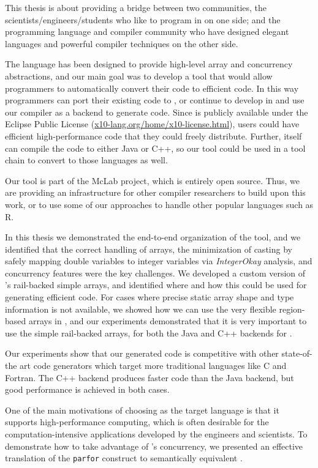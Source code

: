 This thesis is about providing a bridge between two communities,  the
scientists/engineers/students who like to program in \matlab on one
side;  and the programming language and compiler community who have
designed elegant languages and powerful compiler techniques on the other
side.   

The \xten language has been designed to provide high-level  array and
concurrency abstractions,  and  our main goal was to develop a tool that
would allow programmers to automatically convert their \matlab code to
efficient \xten code.    In this way programmers can port their existing
\matlab code to \xten,  or continue to develop in \matlab and use our
\mixten compiler as a backend to generate \xten code.    Since \xten is
publicly available under the Eclipse Public License
(\url{x10-lang.org/home/x10-license.html}),  users could have efficient
high-performance code that they could freely distribute.    Further,
\xten itself can compile the code to either Java or C++,  so our tool
could be used in a tool chain to convert \matlab to those languages as
well.

Our tool is part of the McLab project, which is entirely open
source.   Thus, we are providing  an infrastructure for other compiler
researchers to build upon this work,  or to use some of our approaches
to handle other popular languages such as R.

In this thesis we demonstrated the end-to-end organization of the \mixten
tool, and we identified that the correct handling of arrays, the
minimization of casting by safely mapping \matlab double variables to
\xten integer variables via \emph{IntegerOkay} analysis,  and concurrency
features were the key challenges.   We developed a custom version of \xten's
rail-backed simple arrays,  and identified where and how this
could be used for generating efficient \xten code.  For cases where
precise static array shape and type information is not available, we
showed how we can use the very flexible region-based arrays in \xten,
and our experiments demonstrated that it is very important to use the
simple rail-backed arrays, for both the Java and C++ backends for \xten.

Our experiments show that our generated \xten code is competitive with
other state-of-the art code generators which target more traditional
languages like C and Fortran.   The C++ \xten backend produces faster
code than the Java backend,  but good performance is achieved in both
cases.  

One of the main motivations of choosing \xten as the target language is
that it supports high-performance computing,  which is often desirable
for the computation-intensive applications developed by the engineers
and scientists.   To demonstrate how to take advantage of \xten's
concurrency, we presented 
an effective translation of the \matlab \texttt{parfor} construct to
semantically equivalent \xten.    

